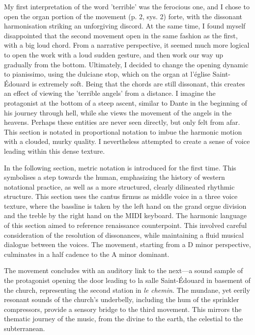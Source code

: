 \documentclass[12pt,twoside,maitrise]{dms_ks}
\theoremstyle{definition}
\begin{document}
{

My first interpretation of the word 'terrible' was the ferocious one, and I chose to open the organ portion of the movement (p. 2, sys. 2) forte, with the dissonant harmonisation striking an unforgiving discord. 
At the same time, I found myself disappointed that the second movement open in the same fashion as the first, with a big loud chord.
From a narrative perspective, it seemed much more logical to open the work with a loud sudden gesture, and then work our way up gradually from the bottom.
Ultimately, I decided to change the opening dynamic to pianissimo, using the dulciane stop, which on the organ at l'église Saint-Édouard is extremely soft.
Being that the chords are still dissonant, this creates an effect of viewing the 'terrible angels' from a distance. 
I imagine the protagonist at the bottom of a steep ascent, similar to Dante in the beginning of his journey through hell, while she views the movement of the angels in the heavens.
Perhaps these entities are never seen directly, but only felt from afar.
This section is notated in proportional notation to imbue the harmonic motion with a clouded, murky quality.
I nevertheless attempted to create a sense of voice leading within this dense texture.

In the following section, metric notation is introduced for the first time.
This symbolises a step towards the human, emphasizing the history of western notational practice, as well as a more structured, clearly dilineated rhythmic structure. 
This section uses the cantus firmus as middle voice in a three voice texture, where the bassline is taken by the left hand on the grand orgue division and the treble by the right hand on the MIDI keyboard.
The harmonic language of this section aimed to reference renaissance counterpoint.
This involved careful consideration of the resolution of dissonances, while maintaining a fluid musical dialogue between the voices.
The movement, starting from a D minor perspective, culminates in a half cadence to the A minor dominant.


The movement concludes with an auditory link to the next---a sound sample of the protagonist opening the door leading to la salle Saint-Édouard in basement of the church, representing the second station in \textit{le chemin}.
The mundane, yet eerily resonant sounds of the church's underbelly, including the hum of  the sprinkler compressors, provide a sensory bridge to the third movement.
This mirrors the thematic journey of the music, from the divine to the earth, the celestial to the subterranean.

}
\end{document}
